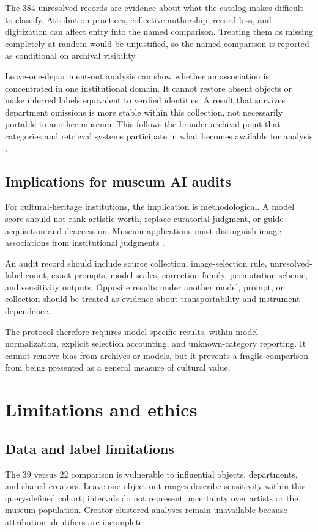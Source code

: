 \documentclass[pdflatex,sn-basic,Numbered]{sn-jnl}
\begin{document}
The 384 unresolved records are evidence about what the catalog makes difficult to classify. Attribution practices, collective authorship, record loss, and digitization can affect entry into the named comparison. Treating them as missing completely at random would be unjustified, so the named comparison is reported as conditional on archival visibility.

Leave-one-department-out analysis can show whether an association is concentrated in one institutional domain. It cannot restore absent objects or make inferred labels equivalent to verified identities. A result that survives department omissions is more stable within this collection, not necessarily portable to another museum. This follows the broader archival point that categories and retrieval systems participate in what becomes available for analysis \cite{bowker2000sorting, caswell2016archival}.

\subsection{Implications for museum AI audits}

For cultural-heritage institutions, the implication is methodological. A model score should not rank artistic worth, replace curatorial judgment, or guide acquisition and deaccession. Museum applications must distinguish image associations from institutional judgments \cite{fiorucci2020machine, srinivasan2021arts}.

An audit record should include source collection, image-selection rule, unresolved-label count, exact prompts, model scales, correction family, permutation scheme, and sensitivity outputs. Opposite results under another model, prompt, or collection should be treated as evidence about transportability and instrument dependence.

The protocol therefore requires model-specific results, within-model normalization, explicit selection accounting, and unknown-category reporting. It cannot remove bias from archives or models, but it prevents a fragile comparison from being presented as a general measure of cultural value.

\section{Limitations and ethics}
\label{sec:limitations}

\subsection{Data and label limitations}
The 39 versus 22 comparison is vulnerable to influential objects, departments, and shared creators. Leave-one-object-out ranges describe sensitivity within this query-defined cohort; intervals do not represent uncertainty over artists or the museum population. Creator-clustered analyses remain unavailable because attribution identifiers are incomplete.
\end{document}
